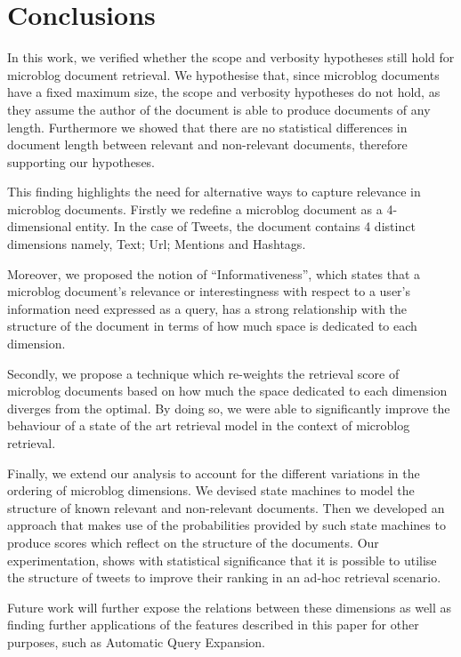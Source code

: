 \section{Conclusions}

\label{conclusion}



In this work, we verified whether the scope and verbosity hypotheses still hold for microblog document retrieval. We hypothesise that, since microblog documents have a fixed maximum size, the scope and verbosity hypotheses do not hold, as they assume the author of the document is able to produce documents of any length. Furthermore we showed that there are no statistical differences in document length between relevant and non-relevant documents, therefore supporting our hypotheses.

This finding highlights the need for alternative ways to capture relevance in microblog documents. Firstly we redefine a microblog document as a 4-dimensional entity. In the case of Tweets, the document contains 4 distinct dimensions namely, Text; Url; Mentions and Hashtags.

Moreover, we proposed the notion of ``Informativeness'', which states that a microblog document's relevance or interestingness with respect to a user's information need expressed as a query, has a strong relationship with the structure of the document in terms of how much space is dedicated to each dimension.

Secondly, we propose a technique which re-weights the retrieval score of microblog documents based on how much the space dedicated to each dimension diverges from the optimal. By doing so, we were able to significantly improve the behaviour of a state of the art retrieval model in the context of microblog retrieval.

Finally, we extend our analysis to account for the different variations in the ordering of microblog dimensions. We devised state machines to model the structure of known relevant and non-relevant documents. Then we developed an approach that makes use of the probabilities provided by such state machines to produce scores which reflect on the structure of the documents. Our experimentation, shows with statistical significance that it is possible to utilise the structure of tweets to improve their ranking in an ad-hoc retrieval scenario.

Future work will further expose the relations between these dimensions as well as finding further applications of the features described in this paper for other purposes, such as Automatic Query Expansion.\\

